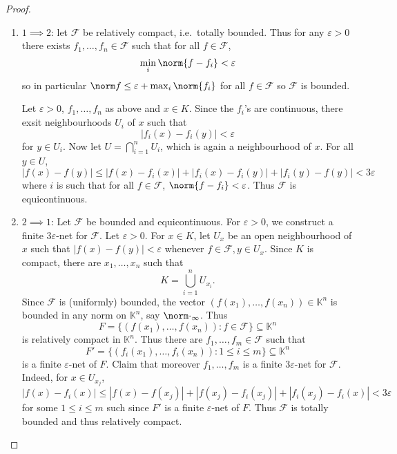\documentclass[a4paper]{article}
\newcommand{\K}{{\mathbb{K}}} %
\begin{document}
\begin{proof}\leavevmode
  \begin{enumerate}
  \item \(1 \implies 2\): let \(\mathcal F\) be relatively compact, i.e.\ totally bounded. Thus for any \(\varepsilon > 0\) there exists \(f_1, \dots, f_n \in \mathcal F\) such that for all \(f \in \mathcal F\),
    \[
      \min_i \norm{f - f_i} < \varepsilon
    \]
    so in particular \(\norm f \leq \varepsilon + \max_i \norm{f_i}\) for all \(f \in \mathcal F\) so \(\mathcal F\) is bounded.

    Let \(\varepsilon > 0\), \(f_1, \dots, f_n\) as above and \(x \in K\). Since the \(f_i\)'s are continuous, there exsit neighbourhoods \(U_i\) of \(x\) such that
    \[
      |f_i(x) - f_i(y)| < \varepsilon
    \]
    for \(y \in U_i\). Now let \(U = \bigcap_{i = 1}^n U_i\), which is again a neighbourhood of \(x\). For all \(y \in U\),
    \[
      |f(x) - f(y)|
      \leq |f(x) - f_i(x)| + |f_i(x) - f_i(y)| + |f_i(y) - f(y)|
      < 3\varepsilon
    \]
    where \(i\) is such that for all \(f \in \mathcal F\), \(\norm{f - f_i} < \varepsilon\). Thus \(\mathcal F\) is equicontinuous.
  \item \(2 \implies 1\): Let \(\mathcal F\) be bounded and equicontinuous. For \(\varepsilon > 0\), we construct a finite \(3\varepsilon\)-net for \(\mathcal F\). Let \(\varepsilon > 0\). For \(x \in K\), let \(U_x\) be an open neighbourhood of \(x\) such that \(|f(x) - f(y)| < \varepsilon\) whenever \(f \in \mathcal F, y \in U_x\). Since \(K\) is compact, there are \(x_1, \dots, x_n\) such that
    \[
      K = \bigcup_{i = 1}^n U_{x_i}.
    \]
    Since \(\mathcal F\) is (uniformly) bounded, the vector \((f(x_1), \dots, f(x_n)) \in \K^n\) is bounded in any norm on \(\K^n\), say \(\norm \cdot_\infty\). Thus
    \[
      F = \{(f(x_1), \dots, f(x_n)): f \in \mathcal F\} \subseteq \K^n
    \]
    is relatively compact in \(\K^n\). Thus there are \(f_1, \dots, f_m \in \mathcal F\) such that
    \[
      F' = \{(f_i(x_1), \dots, f_i(x_n)): 1 \leq i \leq m\} \subseteq \K^n
    \]
    is a finite \(\varepsilon\)-net of \(F\). Claim that moreover \(f_1, \dots, f_m\) is a finite \(3\varepsilon\)-net for \(\mathcal F\). Indeed, for \(x \in U_{x_j}\),
    \[
      |f(x) - f_i(x)|
      \leq |f(x) - f(x_j)| + |f(x_j) - f_i(x_j)| + |f_i(x_j) - f_i(x)|
      < 3 \varepsilon
    \]
    for some \(1 \leq i \leq m\) such since \(F'\) is a finite \(\varepsilon\)-net of \(F\). Thus \(\mathcal F\) is totally bounded and thus relatively compact.
  \end{enumerate}
\end{proof}
\end{document}
